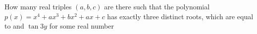 How many real triples $(a,b,c)$ are there such that the polynomial $p(x)=x^4+ax^3+bx^2+ax+c$ has exactly three distinct roots, which are equal to   and $\tan 3y$ for some real number 